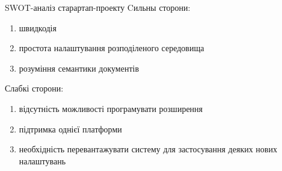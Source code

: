 SWOT-аналіз старартап-проекту
Cильны сторони:
\begin{enumerate}
  \item швидкодія
  \item простота налаштування розподіленого середовища
  \item розуміння семантики документів
\end{enumerate}

Слабкі сторони:
\begin{enumerate}
  \item відсутність можливості програмувати розширення
  \item підтримка однієї платформи
  \item необхідність перевантажувати систему для застосування деяких нових налаштувань
\end{enumerate}
\hspace{10pt}
\cite{Baird1992}
